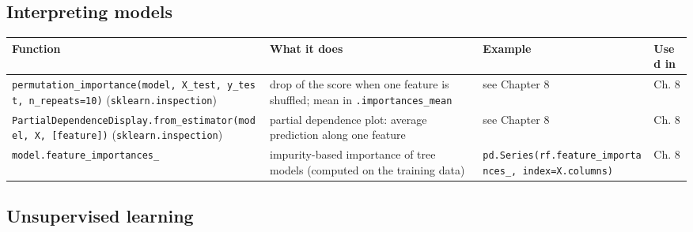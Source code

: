 \documentclass[
  letterpaper,
  DIV=11,
  numbers=noendperiod]{scrreprt}
\begin{document}
\subsection{Interpreting models}\label{interpreting-models-1}

\begin{longtable}[]{@{}
  >{\raggedright\arraybackslash}p{}
  >{\raggedright\arraybackslash}p{}
  >{\raggedright\arraybackslash}p{}
  >{\raggedright\arraybackslash}p{}@{}}
\toprule\noalign{}
\begin{minipage}[b]{\linewidth}\raggedright
Function
\end{minipage} & \begin{minipage}[b]{\linewidth}\raggedright
What it does
\end{minipage} & \begin{minipage}[b]{\linewidth}\raggedright
Example
\end{minipage} & \begin{minipage}[b]{\linewidth}\raggedright
Used in
\end{minipage} \\
\midrule\noalign{}
\endhead
\bottomrule\noalign{}
\endlastfoot
\texttt{permutation\_importance(model,\ X\_test,\ y\_test,\ n\_repeats=10)}
(\texttt{sklearn.inspection}) & drop of the score when one feature is
shuffled; mean in \texttt{.importances\_mean} & see Chapter 8 & Ch. 8 \\
\texttt{PartialDependenceDisplay.from\_estimator(model,\ X,\ {[}feature{]})}
(\texttt{sklearn.inspection}) & partial dependence plot: average
prediction along one feature & see Chapter 8 & Ch. 8 \\
\texttt{model.feature\_importances\_} & impurity-based importance of
tree models (computed on the training data) &
\texttt{pd.Series(rf.feature\_importances\_,\ index=X.columns)} & Ch.
8 \\
\end{longtable}

\subsection{Unsupervised learning}\label{unsupervised-learning}
\end{document}
